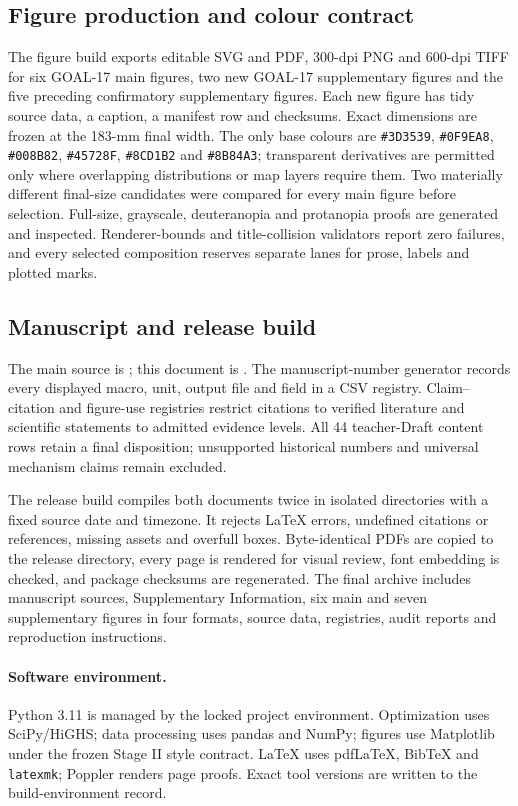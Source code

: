 \subsection{Figure production and colour contract}
The figure build exports editable SVG and PDF, 300-dpi PNG and 600-dpi TIFF for six GOAL-17 main figures, two new GOAL-17 supplementary figures and the five preceding confirmatory supplementary figures. Each new figure has tidy source data, a caption, a manifest row and checksums. Exact dimensions are frozen at the 183-mm final width. The only base colours are \texttt{\#3D3539}, \texttt{\#0F9EA8}, \texttt{\#008B82}, \texttt{\#45728F}, \texttt{\#8CD1B2} and \texttt{\#8B84A3}; transparent derivatives are permitted only where overlapping distributions or map layers require them. Two materially different final-size candidates were compared for every main figure before selection. Full-size, grayscale, deuteranopia and protanopia proofs are generated and inspected. Renderer-bounds and title-collision validators report zero failures, and every selected composition reserves separate lanes for prose, labels and plotted marks.

\subsection{Manuscript and release build}
The main source is ; this document is . The manuscript-number generator records every displayed macro, unit, output file and field in a CSV registry. Claim--citation and figure-use registries restrict citations to verified literature and scientific statements to admitted evidence levels. All 44 teacher-Draft content rows retain a final disposition; unsupported historical numbers and universal mechanism claims remain excluded.

The release build compiles both documents twice in isolated directories with a fixed source date and timezone. It rejects LaTeX errors, undefined citations or references, missing assets and overfull boxes. Byte-identical PDFs are copied to the release directory, every page is rendered for visual review, font embedding is checked, and package checksums are regenerated. The final archive includes manuscript sources, Supplementary Information, six main and seven supplementary figures in four formats, source data, registries, audit reports and reproduction instructions.

\paragraph{Software environment.} Python 3.11 is managed by the locked project environment. Optimization uses SciPy/HiGHS; data processing uses pandas and NumPy; figures use Matplotlib under the frozen Stage II style contract. LaTeX uses pdfLaTeX, BibTeX and \texttt{latexmk}; Poppler renders page proofs. Exact tool versions are written to the build-environment record.


